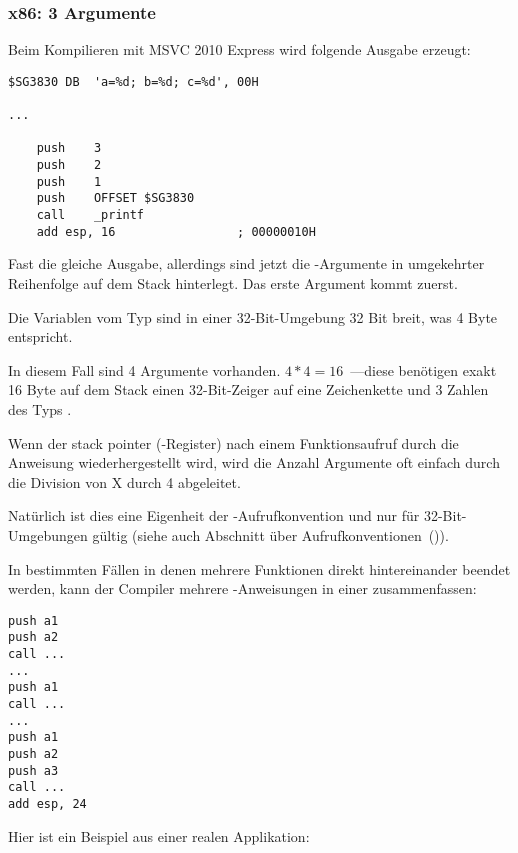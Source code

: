 \subsubsection{x86: 3 Argumente}


Beim Kompilieren mit MSVC 2010 Express wird folgende Ausgabe erzeugt:

\begin{lstlisting}
$SG3830	DB	'a=%d; b=%d; c=%d', 00H

...

	push	3
	push	2
	push	1
	push	OFFSET $SG3830
	call	_printf
	add	esp, 16					; 00000010H
\end{lstlisting}

Fast die gleiche Ausgabe, allerdings sind jetzt die \printf-Argumente in umgekehrter Reihenfolge
auf dem Stack hinterlegt. Das erste Argument kommt zuerst.

Die Variablen vom Typ \Tint sind in einer 32-Bit-Umgebung 32 Bit breit, was 4 Byte entspricht.

In diesem Fall sind 4 Argumente vorhanden. $4*4 = 16$~---diese benötigen exakt 16 Byte auf dem Stack
einen 32-Bit-Zeiger auf eine Zeichenkette und 3 Zahlen des Typs \Tint.

Wenn der \gls{stack pointer} (\ESP-Register) nach einem Funktionsaufruf durch die Anweisung
 wiederhergestellt wird, wird die Anzahl Argumente oft einfach durch
die Division von X durch 4 abgeleitet.

Natürlich ist dies eine Eigenheit der -Aufrufkonvention und nur für 32-Bit-Umgebungen gültig
(siehe auch Abschnitt über Aufrufkonventionen~()).

In bestimmten Fällen in denen mehrere Funktionen direkt hintereinander beendet werden, kann
der Compiler mehrere -Anweisungen in einer zusammenfassen:

\begin{lstlisting}
push a1
push a2
call ...
...
push a1
call ...
...
push a1
push a2
push a3
call ...
add esp, 24
\end{lstlisting}

Hier ist ein Beispiel aus einer realen Applikation:



\clearpage
{}
\myindex{\olly}

